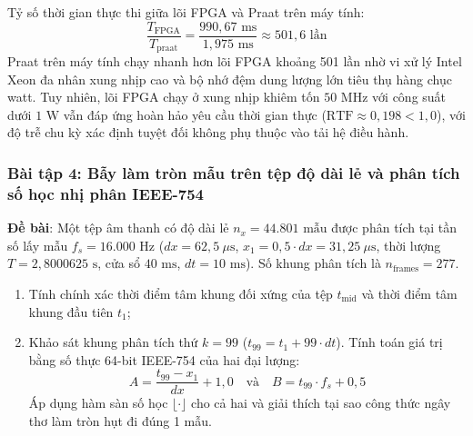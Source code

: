 \begin{enumerate}[label=(\alph*)]
    Tỷ số thời gian thực thi giữa lõi FPGA và Praat trên máy tính:
    \begin{equation}
        \frac{T_{\text{FPGA}}}{T_{\text{praat}}} = \frac{990{,}67\text{ ms}}{1{,}975\text{ ms}} \approx 501{,}6\text{ lần}
    \end{equation}
    Praat trên máy tính chạy nhanh hơn lõi FPGA khoảng 501 lần nhờ vi xử lý Intel Xeon đa nhân xung nhịp cao và bộ nhớ đệm dung lượng lớn tiêu thụ hàng chục watt. Tuy nhiên, lõi FPGA chạy ở xung nhịp khiêm tốn $50\text{ MHz}$ với công suất dưới $1\text{ W}$ vẫn đáp ứng hoàn hảo yêu cầu thời gian thực ($\text{RTF} \approx 0{,}198 < 1{,}0$), với độ trễ chu kỳ xác định tuyệt đối không phụ thuộc vào tải hệ điều hành.
\end{enumerate}

\subsubsection*{Bài tập 4: Bẫy làm tròn mẫu trên tệp độ dài lẻ và phân tích số học nhị phân IEEE-754}
\textbf{Đề bài}: Một tệp âm thanh có độ dài lẻ $n_x = 44.801\text{ mẫu}$ được phân tích tại tần số lấy mẫu $f_s = 16.000\text{ Hz}$ ($dx = 62{,}5\ \mu\text{s}$, $x_1 = 0{,}5 \cdot dx = 31{,}25\ \mu\text{s}$, thời lượng $T = 2{,}8000625\text{ s}$, cửa sổ $40\text{ ms}$, $dt = 10\text{ ms}$). Số khung phân tích là $n_{\text{frames}} = 277$.
\begin{enumerate}[label=(\alph*)]
    \item Tính chính xác thời điểm tâm khung đối xứng của tệp $t_{\text{mid}}$ và thời điểm tâm khung đầu tiên $t_1$;
    \item Khảo sát khung phân tích thứ $k = 99$ ($t_{99} = t_1 + 99 \cdot dt$). Tính toán giá trị bằng số thực 64-bit IEEE-754 của hai đại lượng:
    \begin{equation}
        A = \frac{t_{99} - x_1}{dx} + 1{,}0 \quad \text{và} \quad B = t_{99} \cdot f_s + 0{,}5
    \end{equation}
    Áp dụng hàm sàn số học $\lfloor \cdot \rfloor$ cho cả hai và giải thích tại sao công thức ngây thơ làm tròn hụt đi đúng 1 mẫu.
\end{enumerate}

